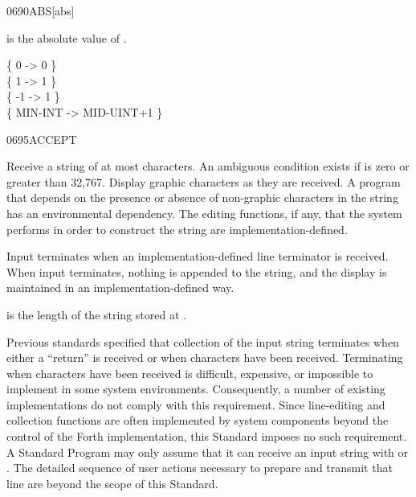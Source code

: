 \begin{worddef}{0690}{ABS}[abs]
\item {}

	 is the absolute value of .

	\begin{defer}
	\testing
		\{       0  ->          0 \} \\
		\{       1  ->          1 \} \\
		\{      -1  ->          1 \} \\
		\{ MIN-INT  -> MID-UINT+1 \}
	\end{defer}
\end{worddef}


\begin{worddef}{0695}{ACCEPT}
\item {}

	Receive a string of at most  characters. An ambiguous
	condition exists if  is zero or greater than 32,767.
	Display graphic characters as they are received. A program that
	depends on the presence or absence of non-graphic characters in the
	string has an environmental dependency. The editing functions, if
	any, that the system performs in order to construct the string are
	implementation-defined.

	Input terminates when an implementation-defined line terminator is
	received. When input terminates, nothing is appended to the string,
	and the display is maintained in an implementation-defined way.

	 is the length of the string stored at \param{c-addr}.

	\begin{defer}
	\rationale %
		Previous standards specified that collection of the input
		string terminates when either a ``return'' is received or when
		 characters have been received. Terminating when
		 characters have been received is difficult,
		expensive, or impossible to implement in some system environments.
		Consequently, a number of existing implementations do not
		comply with this requirement. Since line-editing and collection
		functions are often implemented by system components beyond the
		control of the Forth implementation, this Standard imposes no
		such requirement. A Standard Program may only assume that it
		can receive an input string with  or \word{EXPECT}.
		The detailed sequence of user actions necessary to prepare and
		transmit that line are beyond the scope of this Standard.


\end{defer}
\end{worddef}
